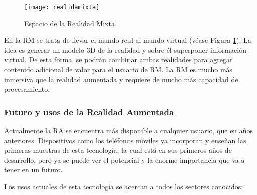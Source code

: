 \begin{figure}[h]
    \centering
    \texttt{[image: realidamixta]}
    \caption{ Espacio de la Realidad Mixta. }
    \label{fig:realidadMixta}
\end{figure}

En la RM se trata de llevar el mundo real al mundo virtual (véase Figura \ref{fig:realidadMixta}). La idea es generar un modelo 3D de la realidad y sobre él superponer información virtual. De esta forma, se podrán combinar ambas realidades para agregar contenido adicional de valor para el usuario de RM. La RM es mucho más inmersiva que la realidad aumentada y requiere de mucho más capacidad de procesamiento. 

\subsubsection{Futuro y usos de la Realidad Aumentada}
Actualmente la RA se encuentra más disponible a cualquier usuario, que en años anteriores. Dispositivos como los teléfonos móviles ya incorporan y enseñan las primeras muestras de esta tecnología, la cual está en sus primeros años de desarrollo, pero ya se puede ver el potencial y la enorme importancia que va a tener en un futuro.

Los usos actuales de esta tecnología se acercan a todos los sectores conocidos:

